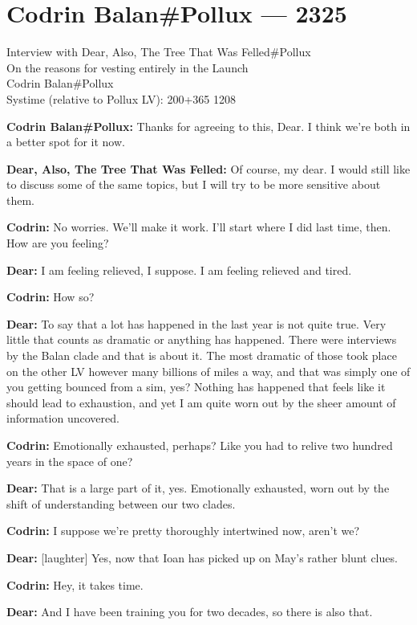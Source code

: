 \hypertarget{codrin-balanpollux-2325}{%
\chapter{Codrin Balan\#Pollux — 2325}\label{codrin-balanpollux-2325}}

Interview with Dear, Also, The Tree That Was Felled\#Pollux\\
On the reasons for vesting entirely in the Launch\\
Codrin Balan\#Pollux\\
Systime (relative to Pollux LV): 200+365 1208

\textbf{Codrin Balan\#Pollux:} Thanks for agreeing to this, Dear. I think we're both in a better spot for it now.

\textbf{Dear, Also, The Tree That Was Felled:} Of course, my dear. I would still like to discuss some of the same topics, but I will try to be more sensitive about them.

\textbf{Codrin:} No worries. We'll make it work. I'll start where I did last time, then. How are you feeling?

\textbf{Dear:} I am feeling relieved, I suppose. I am feeling relieved and tired.

\textbf{Codrin:} How so?

\textbf{Dear:} To say that a lot has happened in the last year is not quite true. Very little that counts as dramatic or anything has happened. There were interviews by the Balan clade and that is about it. The most dramatic of those took place on the other LV however many billions of miles a way, and that was simply one of you getting bounced from a sim, yes? Nothing has happened that feels like it should lead to exhaustion, and yet I am quite worn out by the sheer amount of information uncovered.

\textbf{Codrin:} Emotionally exhausted, perhaps? Like you had to relive two hundred years in the space of one?

\textbf{Dear:} That is a large part of it, yes. Emotionally exhausted, worn out by the shift of understanding between our two clades.

\textbf{Codrin:} I suppose we're pretty thoroughly intertwined now, aren't we?

\textbf{Dear:} {[}laughter{]} Yes, now that Ioan has picked up on May's rather blunt clues.

\textbf{Codrin:} Hey, it takes time.

\textbf{Dear:} And I have been training you for two decades, so there is also that.

